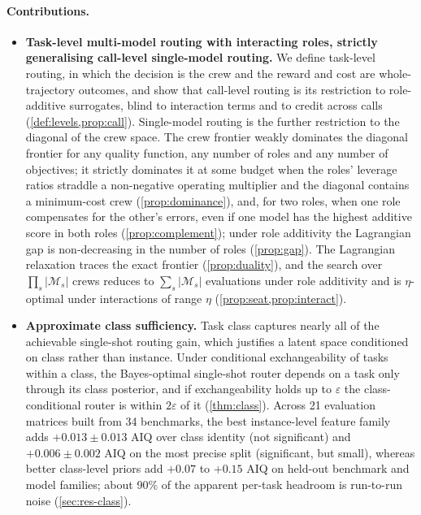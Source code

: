 \documentclass[11pt,a4paper]{article}
\theoremstyle{definition}
\theoremstyle{remark}
\theoremstyle{definition}
\newcommand{\mods}{\mathcal{M}}
\begin{document}
\begin{table}[tbp]
\centering\small

\caption{Summary of results. Brackets: 95\% confidence intervals (task bootstrap); ranges: over verifier accuracy or target quality as stated. Diagonal policy: the same model in every role. AIQ: normalised area under the log-cost quality curve (\cref{sec:problem}).}
\label{tab:summary}
\end{table}

\paragraph{Contributions.}
\begin{itemize}
\item \textbf{Task-level multi-model routing with interacting roles, strictly generalising call-level single-model routing.} We define task-level routing, in which the decision is the crew and the reward and cost are whole-trajectory outcomes, and show that call-level routing is its restriction to role-additive surrogates, blind to interaction terms and to credit across calls (\cref{def:levels,prop:call}). Single-model routing is the further restriction to the diagonal of the crew space. The crew frontier weakly dominates the diagonal frontier for any quality function, any number of roles and any number of objectives; it strictly dominates it at some budget when the roles' leverage ratios straddle a non-negative operating multiplier and the diagonal contains a minimum-cost crew (\cref{prop:dominance}), and, for two roles, when one role compensates for the other's errors, even if one model has the highest additive score in both roles (\cref{prop:complement}); under role additivity the Lagrangian gap is non-decreasing in the number of roles (\cref{prop:gap}). The Lagrangian relaxation traces the exact frontier (\cref{prop:duality}), and the search over $\prod_s|\mods_s|$ crews reduces to $\sum_s|\mods_s|$ evaluations under role additivity and is $\eta$-optimal under interactions of range $\eta$ (\cref{prop:seat,prop:interact}).
\item \textbf{Approximate class sufficiency.} Task class captures nearly all of the achievable single-shot routing gain, which justifies a latent space conditioned on class rather than instance. Under conditional exchangeability of tasks within a class, the Bayes-optimal single-shot router depends on a task only through its class posterior, and if exchangeability holds up to $\varepsilon$ the class-conditional router is within $2\varepsilon$ of it (\cref{thm:class}). Across 21 evaluation matrices built from 34 benchmarks, the best instance-level feature family adds $+0.013\pm0.013$ AIQ over class identity (not significant) and $+0.006\pm0.002$ AIQ on the most precise split (significant, but small), whereas better class-level priors add $+0.07$ to $+0.15$ AIQ on held-out benchmark and model families; about 90\% of the apparent per-task headroom is run-to-run noise (\cref{sec:res-class}).

\end{itemize}
\end{document}
